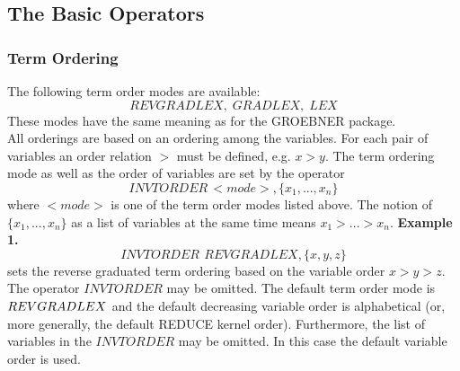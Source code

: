 \subsection{The Basic Operators}
\subsubsection{Term Ordering}
The following term order modes are available:
$$ REVGRADLEX,\; GRADLEX,\; LEX $$
These modes have the same meaning as for the GROEBNER package.\\
All orderings are based on an ordering among the variables.
For each pair of variables an order relation $>$ must be defined,
e.g. $x>y$. The term ordering mode as well as the order of variables
are set by the operator
$$ INVTORDER\,<mode>,\{x_1,...,x_n\} $$
where $<mode>$ is one of the term order modes listed above.
The notion of $\{x_1,...,x_n\}$ as a list of variables
at the same time means $x_1>...>x_n$.
\vskip 0.1cm
\noindent
{\bf Example 1.}
$$ INVTORDER\>\,REVGRADLEX,\{x,y,z\} $$
sets the reverse graduated term ordering based on the variable
order $x>y>z$.\\
The operator $INVTORDER$ may be omitted. The default term order mode
is $REV\-GRADLEX$ and the default decreasing variable order is
alphabetical (or, more generally, the default REDUCE kernel order).
Furthermore, the list of variables in the $INVTORDER$ may be omitted.
In this case the default variable order is used.
